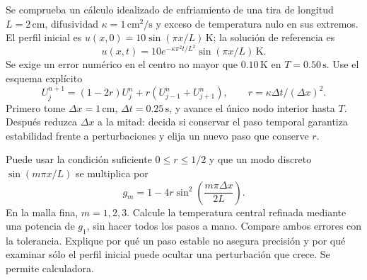 Se comprueba un cálculo idealizado de enfriamiento de una tira de longitud \(L=2\,\mathrm{cm}\), difusividad \(\kappa=1\,\mathrm{cm^2/s}\) y exceso de temperatura nulo en sus extremos. El perfil inicial es \(u(x,0)=10\sin(\pi x/L)\,\mathrm K\); la solución de referencia es
\[
u(x,t)=10e^{-\kappa\pi^2t/L^2}\sin(\pi x/L)\,\mathrm K.
\]
Se exige un error numérico en el centro no mayor que \(0.10\,\mathrm K\) en \(T=0.50\,\mathrm s\). Use el esquema explícito
\[
U_j^{n+1}=(1-2r)U_j^n+r(U_{j-1}^n+U_{j+1}^n),\qquad r=\kappa\Delta t/(\Delta x)^2.
\]
Primero tome \(\Delta x=1\,\mathrm{cm}\), \(\Delta t=0.25\,\mathrm s\), y avance el único nodo interior hasta \(T\). Después reduzca \(\Delta x\) a la mitad: decida si conservar el paso temporal garantiza estabilidad frente a perturbaciones y elija un nuevo paso que conserve \(r\).

Puede usar la condición suficiente \(0\le r\le1/2\) y que un modo discreto \(\sin(m\pi x/L)\) se multiplica por
\[
g_m=1-4r\sin^2\!\left(\frac{m\pi\Delta x}{2L}\right).
\]
En la malla fina, \(m=1,2,3\). Calcule la temperatura central refinada mediante una potencia de \(g_1\), sin hacer todos los pasos a mano. Compare ambos errores con la tolerancia. Explique por qué un paso estable no asegura precisión y por qué examinar sólo el perfil inicial puede ocultar una perturbación que crece. Se permite calculadora.
